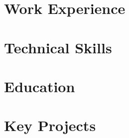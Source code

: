\documentclass[a4paper, oneside, final]{scrartcl} %
\begin{document}
\begin{center} %


{\fontsize{28}{28}\selectfont\scshape{\MyName{}}} %

\vspace{0.8cm} %


\section{Work Experience}




\section{Technical Skills}




\section{Education}




\section{Key Projects}




\end{center}
\end{document}
